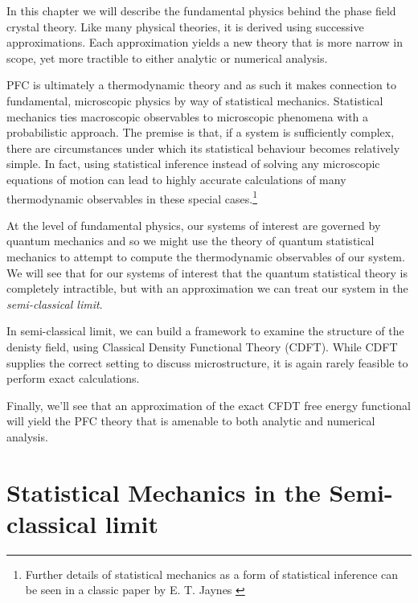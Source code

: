 In this chapter we will describe the fundamental physics behind the phase field
crystal theory.  Like many physical theories, it is derived using successive
approximations.  Each approximation yields a new theory that is more narrow in
scope, yet more tractible to either analytic or numerical analysis.

PFC is ultimately a thermodynamic theory and as such it makes connection to
fundamental, microscopic physics by way of statistical mechanics.  Statistical
mechanics ties macroscopic observables to microscopic phenomena with a
probabilistic approach.  The premise is that, if a system is sufficiently
complex, there are circumstances under which its statistical behaviour becomes
relatively simple.  In fact, using statistical inference instead of solving any
microscopic equations of motion can lead to highly accurate calculations of
many thermodynamic observables in these special cases.\footnote{Further details
of statistical mechanics as a form of statistical inference can be seen in a
classic paper by E. T. Jaynes \cite{JAYNES57}}

At the level of fundamental physics, our systems of interest are governed by
quantum mechanics and so we might use the theory of quantum statistical
mechanics to attempt to compute the thermodynamic observables of our system.
We will see that for our systems of interest that the quantum statistical
theory is completely intractible, but with an approximation we can treat our
system in the \textit{semi-classical limit}.

In semi-classical limit, we can build a framework to examine the structure of
the denisty field, using Classical Density Functional Theory
(CDFT).
 While CDFT
supplies the correct setting to discuss microstructure, it is again rarely
feasible to perform exact calculations.

Finally, we'll see that an approximation of the exact CFDT free energy
functional will yield the PFC theory that is amenable to both analytic and
numerical analysis.

\section{Statistical Mechanics in the Semi-classical limit} %

